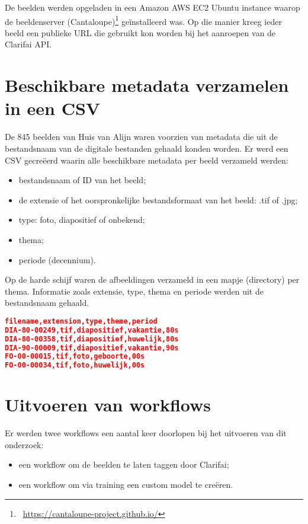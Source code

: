 De beelden werden opgeladen in een Amazon AWS EC2 Ubuntu instance waarop de beeldenserver (Cantaloupe)\footnote{~\url{https://cantaloupe-project.github.io/}} ge\"{i}nstalleerd was. Op die manier kreeg ieder beeld een publieke URL die gebruikt kon worden bij het aanroepen van de Clarifai API.

\section{Beschikbare metadata verzamelen in een CSV}
\label{sec:metadata-verzamelen-csv}

De 845 beelden van Huis van Alijn waren voorzien van metadata die uit de bestandsnaam van de digitale bestanden gehaald konden worden. Er werd een CSV gecreëerd waarin alle beschikbare metadata per beeld verzameld werden:
\begin{itemize}
	\item bestandsnaam of ID van het beeld;
	\item de extensie of het oorspronkelijke bestandsformaat van het beeld: .tif of .jpg;
	\item type: foto, diapositief of onbekend;
	\item thema;
	\item periode (decennium).
\end{itemize}

Op de harde schijf waren de afbeeldingen verzameld in een mapje (directory) per thema. Informatie zoals extensie, type, thema en periode werden uit de bestandsnaam gehaald.

\begin{lstlisting}[language=json,caption=Een fragment van de CSV. De bestandsnaam heeft de logica \textit{type-periode-nr} waaruit onder meer de periode gehaald kan worden.]
filename,extension,type,theme,period
DIA-80-00249,tif,diapositief,vakantie,80s
DIA-80-00358,tif,diapositief,huwelijk,80s
DIA-90-00009,tif,diapositief,vakantie,90s
FO-00-00015,tif,foto,geboorte,00s
FO-00-00034,tif,foto,huwelijk,00s
\end{lstlisting}

\section{Uitvoeren van workflows}
\label{sec:uitvoeren-workflows}

Er werden twee workflows een aantal keer doorlopen bij het uitvoeren van dit onderzoek:
\begin{itemize}
	\item een workflow om de beelden te laten taggen door Clarifai;
	\item een workflow om via training een custom model te cre\"{e}ren.
\end{itemize}

